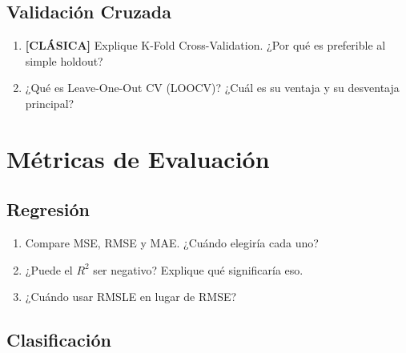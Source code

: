 \documentclass[11pt,a4paper]{article}
\begin{document}
\subsection{Validaci\'on Cruzada}

\begin{enumerate}[label=\textbf{P\arabic*.}, resume]

\item \leavevmode

\begin{classicbox}
\textcolor{tdred}{\textbf{[CL\'ASICA]}} Explique K-Fold Cross-Validation. ¿Por qu\'e
es preferible al simple holdout?
\end{classicbox}

\item ¿Qu\'e es Leave-One-Out CV (LOOCV)? ¿Cu\'al es su ventaja y su desventaja principal?

\end{enumerate}

\section{M\'etricas de Evaluaci\'on}

\subsection{Regresi\'on}

\begin{enumerate}[label=\textbf{P\arabic*.}, resume]

\item Compare MSE, RMSE y MAE. ¿Cu\'ando elegir\'ia cada uno?

\item ¿Puede el $R^2$ ser negativo? Explique qu\'e significar\'ia eso.

\item ¿Cu\'ando usar RMSLE en lugar de RMSE?

\end{enumerate}

\subsection{Clasificaci\'on}
\end{document}
